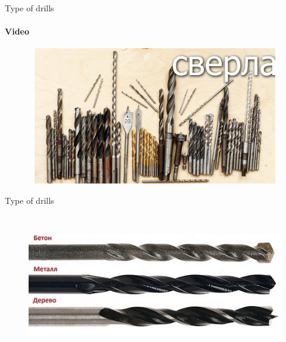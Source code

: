 \documentclass[aspectratio=169]{beamer}
\begin{document}
\begin{frame}[t]{Type of drills}
    \framesubtitle{Video}
    \vspace{-0.6cm}
    \begin{figure}[H]
        \href{https://youtu.be/1TvtzPEFVIg}{
            \centering\includegraphics[height=6cm,width=1\textwidth,keepaspectratio]{type_of_drills_video.jpg}}
        \label{fig:type_of_drills_video.jpg}
    \end{figure}
\end{frame}

\begin{frame}[t]{Type of drills}
    \framesubtitle{}
    \vspace{-0.6cm}
    \begin{figure}[H]
        \centering\includegraphics[height=6cm,width=1\textwidth,keepaspectratio]{types_of_drills.jpg}
        \label{fig:types_of_drills.jpg}
    \end{figure}
\end{frame}
\end{document}
